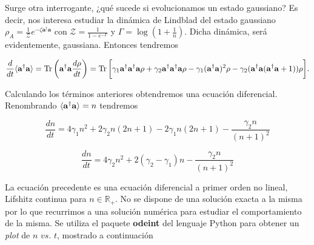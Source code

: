 \documentclass{report} %
\newcommand{\lgg}{\langle}
\newcommand{\rgg}{\rangle}
\numberwithin{equation}{section}
\begin{document}

Surge otra interrogante, ¿qué sucede si evolucionamos un estado gaussiano? Es decir, nos interesa estudiar la dinámica de Lindblad del estado gaussiano $\rho_{A} = \frac{1}{\mathcal{Z}} e^{-\zeta {\mathbf a}^{\dagger} {\mathbf a}}$ con $\mathcal{Z} = \frac{1}{1-e^{-\Gamma}}$ y $\Gamma= \log\left(1+\frac{1}{n}\right)$. Dicha dinámica, será evidentemente, gaussiana. Entonces tendremos

\begin{align}
    \frac{d}{dt} \lgg {\mathbf a}^{\dagger}{\mathbf a} \rgg = \Tr \left({\mathbf a}^{\dagger}{\mathbf a}\frac{d\rho}{dt}\right)
    = \Tr \bigg[\gamma_1 {\mathbf a}^{\dagger}{\mathbf a}^{\dagger}{\mathbf a}\rho+ \gamma_2{\mathbf a}^{\dagger}{\mathbf a}^{\dagger}{\mathbf a}\rho - \gamma_1 ({\mathbf a}^{\dagger}{\mathbf a})^2 \rho - \gamma_2 ({\mathbf a}^{\dagger}{\mathbf a}({\mathbf a}^{\dagger}{\mathbf a}+1))\rho\bigg].
\end{align}

Calculando los términos anteriores obtendremos una ecuación diferencial. Renombrando $\lgg {\mathbf a}^{\dagger}{\bf a} \rgg = n$ tendremos 

\begin{Omitir}
\begin{equation}
    \frac{dn}{dt}= 4\gamma_1 n^2 + 2\gamma_2 n(2n+1) - 2\gamma_1 n(2n+1)-\frac{\gamma_2n}{(n+1)^2}
\end{equation}
\end{Omitir}

\begin{equation}
    \frac{dn}{dt}= 4\gamma_2 n^2 + 2(\gamma_2 - \gamma_1) n - \frac{\gamma_2 n}{(n+1)^2}
    \label{eq:dif_model1}
\end{equation}

La ecuación precedente es una ecuación diferencial a primer orden no lineal, Lifshitz continua para $n \in \mathds{R}_{+}$. No se dispone de una solución exacta a la misma por lo que recurrimos a una solución numérica para estudiar el comportamiento de la misma. Se utiliza el paquete \textbf{odeint} del lenguaje Python para obtener un \textit{plot} de $n$ $vs$. $t$, mostrado a continuación
\end{document}
